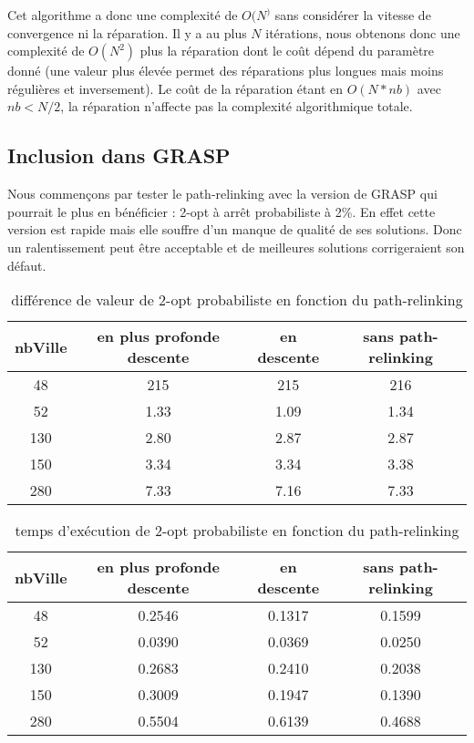 \documentclass[12pt,a4paper]{article}
\begin{document}
Cet algorithme a donc une complexité de $O(N^)$ sans considérer la vitesse de convergence ni la réparation. Il y a au plus $N$ itérations, nous obtenons donc une complexité de $O(N^2)$ plus la réparation dont le coût dépend du paramètre donné (une valeur plus élevée permet des réparations plus longues mais moins régulières et inversement). Le coût de la réparation étant en $O(N*nb)$ avec $nb<N/2$, la réparation n'affecte pas la complexité algorithmique totale.\\

\subsection{Inclusion dans GRASP}

Nous commençons par tester le path-relinking avec la version de GRASP qui pourrait le plus en bénéficier : 2-opt à arrêt probabiliste à 2\%. En effet cette version est rapide mais elle souffre d'un manque de qualité de ses solutions. Donc un ralentissement peut être acceptable et de meilleures solutions corrigeraient son défaut.

\begin{table}[!h]
\centering
\begin{tabular}{|*{4}{c|}}
\hline
nbVille & en plus profonde descente & en descente & sans path-relinking \\
\hline
48 & 215 & 215 & 216 \\
52 & 1.33 & 1.09 & 1.34 \\
130 & 2.80 & 2.87 & 2.87 \\
150 & 3.34 & 3.34 & 3.38 \\
280 & 7.33 & 7.16 & 7.33 \\
\hline
\end{tabular}
\caption{différence de valeur de 2-opt probabiliste en fonction du path-relinking}
\label{val2optgraspPR}
\end{table}

\begin{table}[!h]
\centering
\begin{tabular}{|*{4}{c|}}
\hline
nbVille & en plus profonde descente & en descente & sans path-relinking \\
\hline
48 & 0.2546 & 0.1317 & 0.1599 \\
52 & 0.0390 & 0.0369 & 0.0250 \\
130 & 0.2683 & 0.2410 & 0.2038 \\
150 & 0.3009 & 0.1947 & 0.1390 \\
280 & 0.5504 & 0.6139 & 0.4688 \\
\hline
\end{tabular}
\caption{temps d’exécution de 2-opt probabiliste en fonction du path-relinking}
\label{temps2optgraspPR}
\end{table}
\end{document}
